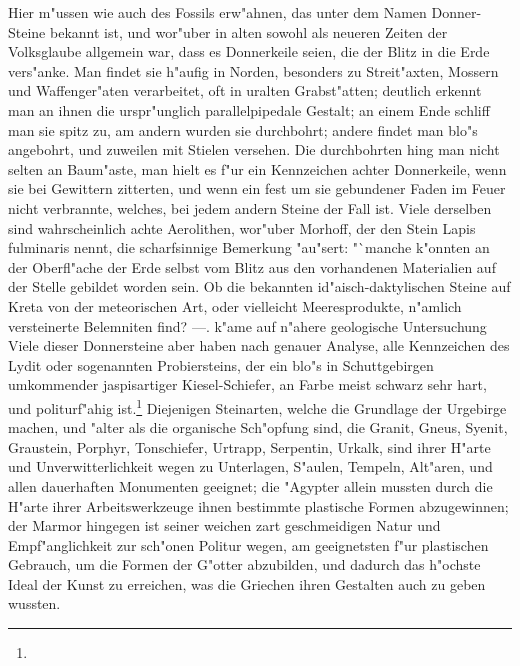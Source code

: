 \documentclass[a4paper, 11pt, oneside, polutonikogreek, german]{article}
\begin{document}
Hier m"ussen wie auch des Fossils erw"ahnen, das unter dem Namen Donner-Steine bekannt ist, und wor"uber in alten sowohl als neueren Zeiten der Volksglaube allgemein war, dass es Donnerkeile seien, die der Blitz in die Erde vers"anke. Man findet sie h"aufig in Norden, besonders zu Streit"axten, Mossern und Waffenger"aten verarbeitet, oft in uralten Grabst"atten; deutlich erkennt man an ihnen die urspr"unglich parallelpipedale Gestalt; an einem Ende schliff man sie spitz zu, am andern wurden sie durchbohrt; andere findet man blo"s angebohrt, und zuweilen mit Stielen versehen. Die durchbohrten hing man nicht selten an Baum"aste, man hielt es f"ur ein Kennzeichen achter Donnerkeile, wenn sie bei Gewittern zitterten, und wenn ein fest um sie gebundener Faden im Feuer nicht verbrannte, welches, bei jedem andern Steine der Fall ist. Viele derselben sind wahrscheinlich achte Aerolithen, wor"uber Morhoff, der den Stein Lapis fulminaris nennt, die scharfsinnige Bemerkung "au"sert: "`manche k"onnten an der Oberfl"ache der Erde selbst vom Blitz aus den vorhandenen Materialien auf der Stelle gebildet worden sein. Ob die bekannten id"aisch-daktylischen Steine auf Kreta von der meteorischen Art, oder vielleicht Meeresprodukte, n"amlich versteinerte Belemniten find? ---. k"ame auf n"ahere geologische Untersuchung Viele dieser Donnersteine aber haben nach genauer Analyse, alle Kennzeichen des Lydit oder sogenannten Probiersteins, der ein blo"s in Schuttgebirgen umkommender jaspisartiger Kiesel-Schiefer, an Farbe meist schwarz sehr hart, und politurf"ahig ist.\footnote{} Diejenigen Steinarten, welche die Grundlage der Urgebirge machen, und "alter als die organische Sch"opfung sind, die Granit, Gneus, Syenit, Graustein, Porphyr, Tonschiefer, Urtrapp, Serpentin, Urkalk, sind ihrer H"arte und Unverwitterlichkeit wegen zu Unterlagen, S"aulen, Tempeln, Alt"aren, und allen dauerhaften Monumenten geeignet; die "Agypter allein mussten durch die H"arte ihrer Arbeitswerkzeuge ihnen bestimmte plastische Formen abzugewinnen; der Marmor hingegen ist seiner weichen zart geschmeidigen Natur und Empf"anglichkeit zur sch"onen Politur wegen, am geeignetsten f"ur plastischen Gebrauch, um die Formen der G"otter abzubilden, und dadurch das h"ochste Ideal der Kunst zu erreichen, was die Griechen ihren Gestalten auch zu geben wussten.
\end{document}
